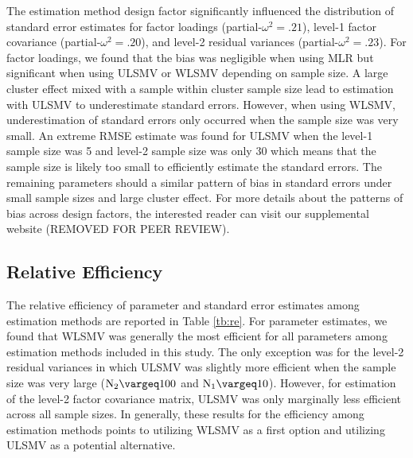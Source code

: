 \documentclass[Review,sageh,times, doublespace]{sagej}
\renewcommand{\geq}{\vargeq}
\begin{document}
The estimation method design factor significantly influenced the distribution of standard error estimates for factor loadings (partial-$\omega^2 = .21$), level-1 factor covariance (partial-$\omega^2 = .20$), and level-2 residual variances (partial-$\omega^2 = .23$).
For factor loadings, we found that the bias was negligible when using MLR but significant when using ULSMV or WLSMV depending on sample size.
A large cluster effect mixed with a sample within cluster sample size lead to estimation with ULSMV to underestimate standard errors.
However, when using WLSMV, underestimation of standard errors only occurred when the sample size was very small.
An extreme RMSE estimate was found for ULSMV when the level-1 sample size was 5 and level-2 sample size was only 30 which means that the sample size is likely too small to efficiently estimate the standard errors.
The remaining parameters should a similar pattern of bias in standard errors under small sample sizes and large cluster effect.
For more details about the patterns of bias across design factors, the interested reader can visit our supplemental website (REMOVED FOR PEER REVIEW). %

\subsection{Relative Efficiency}
The relative efficiency of parameter and standard error estimates among estimation methods are reported in Table \ref{tb:re}. 
For parameter estimates, we found that WLSMV was generally the most efficient for all parameters among estimation methods included in this study.
The only exception was for the level-2 residual variances in which ULSMV was slightly more efficient when the sample size was very large ($\rm N_2 \geq 100$ and $\rm N_1 \geq 10$).
However, for estimation of the level-2 factor covariance matrix, ULSMV was only marginally less efficient across all sample sizes.
In generally, these results for the efficiency among estimation methods points to utilizing WLSMV as a first option and utilizing ULSMV as a potential alternative.
\end{document}
